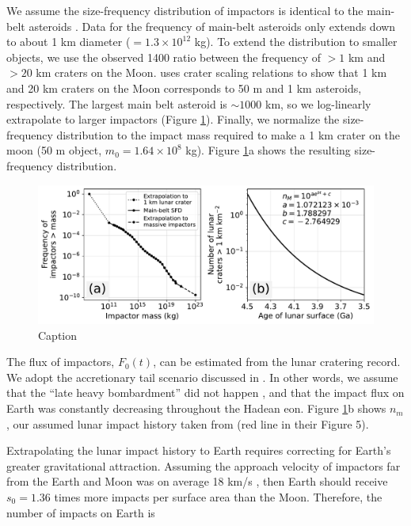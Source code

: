 \documentclass[preprint]{aastex63}
\begin{document}
We assume the size-frequency distribution of impactors is identical to the main-belt asteroids \citep[Extended Data Figure 1,][]{Marchi_2014}. Data for the frequency of main-belt asteroids only extends down to about 1 km diameter ($= 1.3 \times 10^{12} $ kg). To extend the distribution to smaller objects, we use the observed 1400 ratio between the frequency of $> 1$ km and $> 20$ km craters on the Moon. \citet{Morbidelli_2018} uses crater scaling relations to show that 1 km and 20 km craters on the Moon corresponds to 50 m and 1 km asteroids, respectively. The largest main belt asteroid is $\sim 1000$ km, so we log-linearly extrapolate to larger impactors (Figure \ref{fig:sfd_and_flux}). Finally, we normalize the size-frequency distribution to the impact mass required to make a 1 km crater on the moon (50 m object, $m_0 = 1.64 \times 10^{8}$ kg). Figure \ref{fig:sfd_and_flux}a shows the resulting size-frequency distribution.

\begin{figure}
  \centering
  \includegraphics[width=1.0\textwidth]{figures/SFD_and_flux.pdf}
  \caption{Caption}
  \label{fig:sfd_and_flux}
\end{figure}

The flux of impactors, $F_0(t)$, can be estimated from the lunar cratering record. We adopt the accretionary tail scenario discussed in \citet{Morbidelli_2018}. In other words, we assume that the ``late heavy bombardment'' did not happen \citep{Cartwright_2022,Hartmann_2019,Zellner_2017}, and that the impact flux on Earth was constantly decreasing throughout the Hadean eon. Figure \ref{fig:sfd_and_flux}b shows $n_m$, our assumed lunar impact history taken from \citet{Morbidelli_2018} (red line in their Figure 5).

Extrapolating the lunar impact history to Earth requires correcting for Earth's greater gravitational attraction. Assuming the approach velocity of impactors far from the Earth and Moon was on average 18 km/s \citep{Morbidelli_2018}, then Earth should receive $s_0 = 1.36$ times more impacts per surface area than the Moon. Therefore, the number of impacts on Earth is
\end{document}
